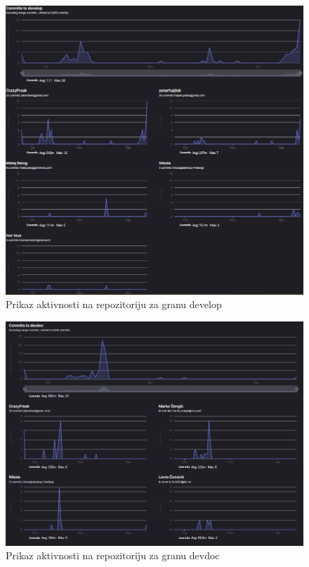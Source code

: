 	
		\begin{figure}[H]
			\includegraphics[width=\textwidth]{slike/commits-develop.png} %
			\caption{Prikaz aktivnosti na repozitoriju za granu develop}
			\label{fig:CommitsDevelop} %
		\end{figure}
  
		\begin{figure}[H]
			\includegraphics[width=\textwidth]{slike/commits-devdoc.png} %
			\caption{Prikaz aktivnosti na repozitoriju za granu devdoc}
			\label{fig:CommitsDevdoc} %
		\end{figure}